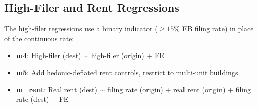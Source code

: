 \documentclass[
  11pt,
]{article}
\providecommand{\tightlist}{%
  \setlength{\itemsep}{0pt}\setlength{\parskip}{0pt}}
\begin{document}
\subsection{High-Filer and Rent
Regressions}\label{high-filer-and-rent-regressions}

The high-filer regressions use a binary indicator (\(\ge 15\%\) EB
filing rate) in place of the continuous rate:

\begin{itemize}
\tightlist
\item
  \textbf{m4}: High-filer (dest) \(\sim\) high-filer (origin) + FE
\item
  \textbf{m5}: Add hedonic-deflated rent controls, restrict to
  multi-unit buildings
\item
  \textbf{m\_rent}: Real rent (dest) \(\sim\) filing rate (origin) +
  real rent (origin) + filing rate (dest) + FE
\end{itemize}
\end{document}
